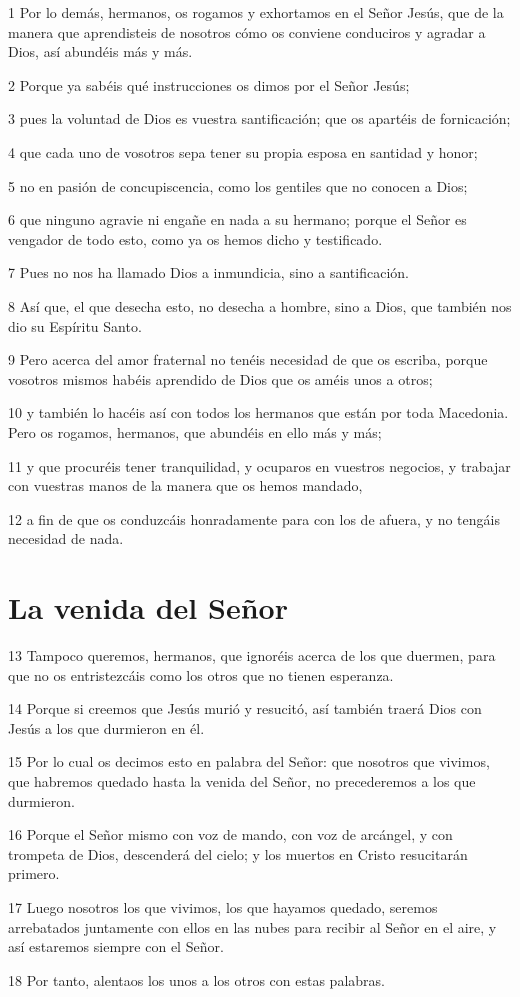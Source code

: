 \par 1 Por lo demás, hermanos, os rogamos y exhortamos en el Señor Jesús, que de la manera que aprendisteis de nosotros cómo os conviene conduciros y agradar a Dios, así abundéis más y más.
\par 2 Porque ya sabéis qué instrucciones os dimos por el Señor Jesús;
\par 3 pues la voluntad de Dios es vuestra santificación; que os apartéis de fornicación;
\par 4 que cada uno de vosotros sepa tener su propia esposa en santidad y honor;
\par 5 no en pasión de concupiscencia, como los gentiles que no conocen a Dios;
\par 6 que ninguno agravie ni engañe en nada a su hermano; porque el Señor es vengador de todo esto, como ya os hemos dicho y testificado.
\par 7 Pues no nos ha llamado Dios a inmundicia, sino a santificación.
\par 8 Así que, el que desecha esto, no desecha a hombre, sino a Dios, que también nos dio su Espíritu Santo.
\par 9 Pero acerca del amor fraternal no tenéis necesidad de que os escriba, porque vosotros mismos habéis aprendido de Dios que os améis unos a otros;
\par 10 y también lo hacéis así con todos los hermanos que están por toda Macedonia. Pero os rogamos, hermanos, que abundéis en ello más y más;
\par 11 y que procuréis tener tranquilidad, y ocuparos en vuestros negocios, y trabajar con vuestras manos de la manera que os hemos mandado,
\par 12 a fin de que os conduzcáis honradamente para con los de afuera, y no tengáis necesidad de nada.

\section*{La venida del Señor}

\par 13 Tampoco queremos, hermanos, que ignoréis acerca de los que duermen, para que no os entristezcáis como los otros que no tienen esperanza.
\par 14 Porque si creemos que Jesús murió y resucitó, así también traerá Dios con Jesús a los que durmieron en él.
\par 15 Por lo cual os decimos esto en palabra del Señor: que nosotros que vivimos, que habremos quedado hasta la venida del Señor, no precederemos a los que durmieron.
\par 16 Porque el Señor mismo con voz de mando, con voz de arcángel, y con trompeta de Dios, descenderá del cielo; y los muertos en Cristo resucitarán primero.
\par 17 Luego nosotros los que vivimos, los que hayamos quedado, seremos arrebatados juntamente con ellos en las nubes para recibir al Señor en el aire, y así estaremos siempre con el Señor.
\par 18 Por tanto, alentaos los unos a los otros con estas palabras.

